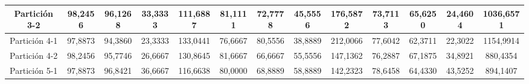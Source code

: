 \documentclass[12pt]{article}
\begin{document}
\begin{table}[H]
{\begin{tabular}{|c|cccc|cccc|cccc|}
Partición 3-2 & \multicolumn{1}{c|}{98,2456}                                                  & \multicolumn{1}{c|}{96,1268}                                                 & \multicolumn{1}{c|}{33,3333} & 111,6887 & \multicolumn{1}{c|}{81,1111}                                                  & \multicolumn{1}{c|}{72,7778}                                                 & \multicolumn{1}{c|}{45,5556} & 176,5872 & \multicolumn{1}{c|}{73,7113}                                                  & \multicolumn{1}{c|}{65,6250}                                                 & \multicolumn{1}{c|}{24,4604} & 1036,6571 \\ \hline
Partición 4-1 & \multicolumn{1}{c|}{97,8873}                                                  & \multicolumn{1}{c|}{94,3860}                                                 & \multicolumn{1}{c|}{23,3333} & 133,0441 & \multicolumn{1}{c|}{76,6667}                                                  & \multicolumn{1}{c|}{80,5556}                                                 & \multicolumn{1}{c|}{38,8889} & 212,0066 & \multicolumn{1}{c|}{77,6042}                                                  & \multicolumn{1}{c|}{62,3711}                                                 & \multicolumn{1}{c|}{22,3022} & 1154,9914 \\ \hline
Partición 4-2 & \multicolumn{1}{c|}{98,2456}                                                  & \multicolumn{1}{c|}{95,7746}                                                 & \multicolumn{1}{c|}{26,6667} & 130,8645 & \multicolumn{1}{c|}{81,6667}                                                  & \multicolumn{1}{c|}{66,6667}                                                 & \multicolumn{1}{c|}{55,5556} & 147,1362 & \multicolumn{1}{c|}{76,2887}                                                  & \multicolumn{1}{c|}{67,1875}                                                 & \multicolumn{1}{c|}{34,8921} & 880,4354  \\ \hline
Partición 5-1 & \multicolumn{1}{c|}{97,8873}                                                  & \multicolumn{1}{c|}{96,8421}                                                 & \multicolumn{1}{c|}{36,6667} & 116,6638 & \multicolumn{1}{c|}{80,0000}                                                  & \multicolumn{1}{c|}{68,8889}                                                 & \multicolumn{1}{c|}{58,8889} & 142,2323 & \multicolumn{1}{c|}{78,6458}                                                  & \multicolumn{1}{c|}{64,4330}                                                 & \multicolumn{1}{c|}{43,5252} & 894,1407  \\ \hline

\end{tabular}}
\end{table}
\end{document}
